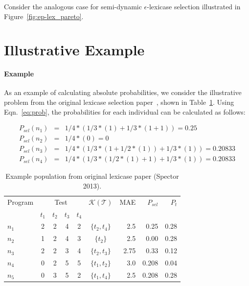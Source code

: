 \documentclass[preprint]{article}
\begin{document}
Consider the analogous case for semi-dynamic $\epsilon$-lexicase selection illustrated in Figure~\ref{fig:ep-lex_pareto}. 

\section{Illustrative Example}
\paragraph{Example}
As an example of calculating absolute probabilities, we consider the illustrative problem from the original lexicase selection paper~\cite{spector_assessment_2013}, shown in Table~\ref{tbl:ex}. Using Eqn.~\ref{eq:prob}, the probabilities for each individual can be calculated as follows:

\begin{align*}
P_{sel}(n_1) &=& 1/4*(1/3*(1)+1/3*(1+1)) = 0.25 \\
P_{sel}(n_2) &=& 1/4*(0) = 0 \\
P_{sel}(n_3) &=&1/4*(1/3*(1+1/2*(1))+1/3*(1)) = 0.20833 \\
P_{sel}(n_4) &=& 1/4*(1/3*(1/2*(1)+1)+1/3*(1)) = 0.20833 
\end{align*}

\begin{table}
\centering
\caption{Example population from original lexicase paper (Spector 2013).}\label{tbl:ex}
\begin{tabular}{l|cccc|c|r|rr}
Program & \multicolumn{4}{c}{Test} & $\mathcal{K}(\mathcal{T})$ & MAE & $P_{sel}$ & $P_{t}$\\
& $t_1$ & $t_2$ & $t_3$ & $t_4$ & \\ \hline
$n_1$ & 2 & 2 & 4 & 2 & $\{t_2,t_4\}$ &	2.5		&	0.25 	& 	0.28	\\
$n_2$ & 1 & 2 & 4 & 3 & $\{t_2\}$		&	2.5		&	0.00	&	0.28	\\
$n_3$ & 2 & 2 & 3 & 4 & $\{t_2,t_3\}$ &	2.75	& 	0.33	&	0.12	\\
$n_4$ & 0 & 2 & 5 & 5 & $\{t_1,t_2\}$ &	3.0		& 	0.208	&	0.04	\\
$n_5$ & 0 & 3 & 5 & 2 & $\{t_1,t_4\}$ &	2.5		&	0.208	&	0.28
\end{tabular}
\end{table}
\end{document}
